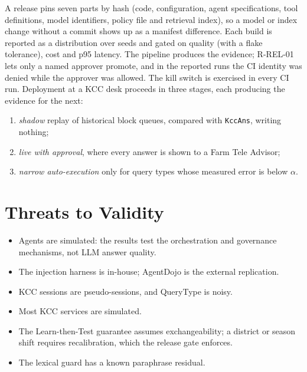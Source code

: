 A release pins seven parts by hash (code, configuration, agent specifications, tool definitions, model
identifiers, policy file and retrieval index), so a model or index change without a commit shows up as
a manifest difference. Each build is reported as a distribution over seeds and gated on quality (with a
flake tolerance), cost and p95 latency. The pipeline produces the evidence; R-REL-01 lets only a named
approver promote, and in the reported runs the CI identity was denied while the approver was allowed.
The kill switch is exercised in every CI run. Deployment at a KCC desk proceeds in three stages, each
producing the evidence for the next:
\begin{enumerate}
  \item \emph{shadow} replay of historical block queues, compared with \texttt{KccAns}, writing nothing;
  \item \emph{live with approval}, where every answer is shown to a Farm Tele Advisor;
  \item \emph{narrow auto-execution} only for query types whose measured error is below $\alpha$.
\end{enumerate}

\section{Threats to Validity}
\label{sec:gov-threats}

\begin{itemize}
  \item Agents are simulated: the results test the orchestration and governance mechanisms, not LLM
        answer quality.
  \item The injection harness is in-house; AgentDojo \citep{debenedetti2024agentdojo} is the external
        replication.
  \item KCC sessions are pseudo-sessions, and QueryType is noisy.
  \item Most KCC services are simulated.
  \item The Learn-then-Test guarantee assumes exchangeability; a district or season shift requires
        recalibration, which the release gate enforces.
  \item The lexical guard has a known paraphrase residual.
\end{itemize}
